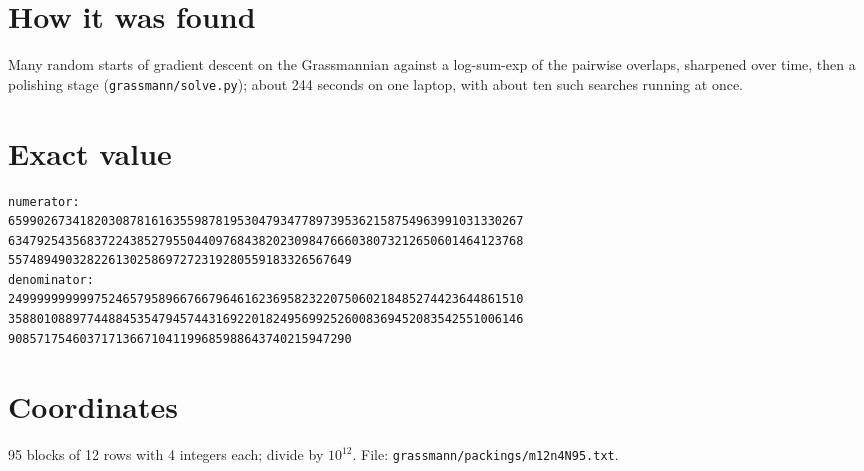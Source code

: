 \documentclass[11pt,a4paper]{article}
\begin{document}
\section{How it was found}
Many random starts of gradient descent on the Grassmannian against a log-sum-exp of the pairwise overlaps, sharpened over time, then a polishing stage (\texttt{grassmann/solve.py}); about 244 seconds on one laptop, with about ten such searches running at once.


\appendix
\section{Exact value}
{\small
\begin{verbatim}
numerator:
659902673418203087816163559878195304793477897395362158754963991031330267
634792543568372243852795504409768438202309847666038073212650601464123768
557489490328226130258697272319280559183326567649
denominator:
249999999999752465795896676679646162369582322075060218485274423644861510
358801088977448845354794574431692201824956992526008369452083542551006146
908571754603717136671041199685988643740215947290
\end{verbatim}}

\section{Coordinates}
95 blocks of 12 rows with 4 integers each; divide by $10^{12}$. File: \texttt{grassmann/packings/m12n4N95.txt}.
{\tiny
\begin{multicols}{3}
\end{multicols}}
\end{document}
